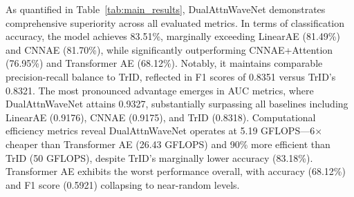 \documentclass[conference]{IEEEtran}
\begin{document}

As quantified in Table~\ref{tab:main_results}, DualAttnWaveNet demonstrates comprehensive superiority across all evaluated metrics. In terms of classification accuracy, the model achieves 83.51\%, marginally exceeding LinearAE (81.49\%) and CNNAE (81.70\%), while significantly outperforming CNNAE+Attention (76.95\%) and Transformer AE (68.12\%). Notably, it maintains comparable precision-recall balance to TrID, reflected in F1 scores of 0.8351 versus TrID’s 0.8321. The most pronounced advantage emerges in AUC metrics, where DualAttnWaveNet attains 0.9327, substantially surpassing all baselines including LinearAE (0.9176), CNNAE (0.9175), and TrID (0.8318). Computational efficiency metrics reveal DualAttnWaveNet operates at 5.19 GFLOPS—6× cheaper than Transformer AE (26.43 GFLOPS) and 90\% more efficient than TrID (50 GFLOPS), despite TrID’s marginally lower accuracy (83.18\%). Transformer AE exhibits the worst performance overall, with accuracy (68.12\%) and F1 score (0.5921) collapsing to near-random levels.
\end{document}
